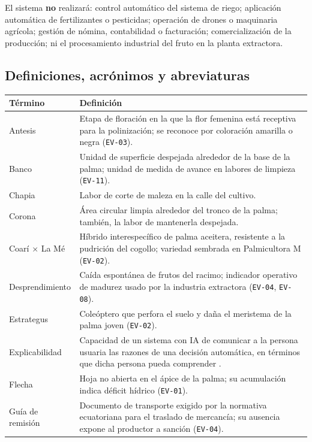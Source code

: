 \documentclass[11pt,a4paper]{article}
\newcommand{\id}[1]{\texttt{\begingroup\hyphenpenalty=10000\relax#1\endgroup}}
\renewcommand{\id}[1]{\texttt{#1}}
\begin{document}
El sistema \textbf{no} realizará: control automático del sistema de riego; aplicación automática de
fertilizantes o pesticidas; operación de drones o maquinaria agrícola; gestión de nómina, contabilidad
o facturación; comercialización de la producción; ni el procesamiento industrial del fruto en la
planta extractora.

\subsection{Definiciones, acrónimos y abreviaturas}

\begin{longtable}{|L{3.6cm}|L{11.8cm}|}
\hline
{}\textbf{Término} & \textbf{Definición} \\
\hline
\endhead
Antesis & Etapa de floración en la que la flor femenina está receptiva para la polinización; se reconoce por coloración amarilla o negra (\id{EV-03}). \\ \hline
Banco & Unidad de superficie despejada alrededor de la base de la palma; unidad de medida de avance en labores de limpieza (\id{EV-11}). \\ \hline
Chapia & Labor de corte de maleza en la calle del cultivo. \\ \hline
Corona & Área circular limpia alrededor del tronco de la palma; también, la labor de mantenerla despejada. \\ \hline
Coarí × La Mé & Híbrido interespecífico de palma aceitera, resistente a la pudrición del cogollo; variedad sembrada en Palmicultora M (\id{EV-02}). \\ \hline
Desprendimiento & Caída espontánea de frutos del racimo; indicador operativo de madurez usado por la industria extractora (\id{EV-04}, \id{EV-08}). \\ \hline
Estrategus & Coleóptero que perfora el suelo y daña el meristema de la palma joven (\id{EV-02}). \\ \hline
Explicabilidad & Capacidad de un sistema con IA de comunicar a la persona usuaria las razones de una decisión automática, en términos que dicha persona pueda comprender \cite{chazette2020}. \\ \hline
Flecha & Hoja no abierta en el ápice de la palma; su acumulación indica déficit hídrico (\id{EV-01}). \\ \hline
Guía de remisión & Documento de transporte exigido por la normativa ecuatoriana para el traslado de mercancía; su ausencia expone al productor a sanción (\id{EV-04}). \\ \hline

\end{longtable}
\end{document}
